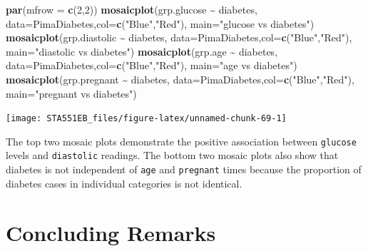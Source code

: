 \documentclass[
]{book}
\newenvironment{Shaded}{\begin{snugshade}}{\end{snugshade}}
\newcommand{\AttributeTok}[1]{\textcolor[rgb]{0.13,0.29,0.53}{#1}}
\newcommand{\DecValTok}[1]{\textcolor[rgb]{0.00,0.00,0.81}{#1}}
\newcommand{\FunctionTok}[1]{\textcolor[rgb]{0.13,0.29,0.53}{\textbf{#1}}}
\newcommand{\NormalTok}[1]{#1}
\newcommand{\SpecialCharTok}[1]{\textcolor[rgb]{0.81,0.36,0.00}{\textbf{#1}}}
\newcommand{\StringTok}[1]{\textcolor[rgb]{0.31,0.60,0.02}{#1}}
\begin{document}
\begin{Shaded}
\begin{Highlighting}[]
\FunctionTok{par}\NormalTok{(}\AttributeTok{mfrow =} \FunctionTok{c}\NormalTok{(}\DecValTok{2}\NormalTok{,}\DecValTok{2}\NormalTok{))}
\FunctionTok{mosaicplot}\NormalTok{(grp.glucose }\SpecialCharTok{\textasciitilde{}}\NormalTok{ diabetes, }\AttributeTok{data=}\NormalTok{PimaDiabetes,}\AttributeTok{col=}\FunctionTok{c}\NormalTok{(}\StringTok{"Blue"}\NormalTok{,}\StringTok{"Red"}\NormalTok{), }\AttributeTok{main=}\StringTok{"glucose vs diabetes"}\NormalTok{)}
\FunctionTok{mosaicplot}\NormalTok{(grp.diastolic }\SpecialCharTok{\textasciitilde{}}\NormalTok{ diabetes, }\AttributeTok{data=}\NormalTok{PimaDiabetes,}\AttributeTok{col=}\FunctionTok{c}\NormalTok{(}\StringTok{"Blue"}\NormalTok{,}\StringTok{"Red"}\NormalTok{), }\AttributeTok{main=}\StringTok{"diastolic vs diabetes"}\NormalTok{)}
\FunctionTok{mosaicplot}\NormalTok{(grp.age }\SpecialCharTok{\textasciitilde{}}\NormalTok{ diabetes, }\AttributeTok{data=}\NormalTok{PimaDiabetes,}\AttributeTok{col=}\FunctionTok{c}\NormalTok{(}\StringTok{"Blue"}\NormalTok{,}\StringTok{"Red"}\NormalTok{), }\AttributeTok{main=}\StringTok{"age vs diabetes"}\NormalTok{)}
\FunctionTok{mosaicplot}\NormalTok{(grp.pregnant }\SpecialCharTok{\textasciitilde{}}\NormalTok{ diabetes, }\AttributeTok{data=}\NormalTok{PimaDiabetes,}\AttributeTok{col=}\FunctionTok{c}\NormalTok{(}\StringTok{"Blue"}\NormalTok{,}\StringTok{"Red"}\NormalTok{), }\AttributeTok{main=}\StringTok{"pregnant vs diabetes"}\NormalTok{)}
\end{Highlighting}
\end{Shaded}

\begin{center}\texttt{[image: STA551EB\_files/figure-latex/unnamed-chunk-69-1]} \end{center}

The top two mosaic plots demonstrate the positive association between \texttt{glucose} levels and \texttt{diastolic} readings. The bottom two mosaic plots also show that diabetes is not independent of \texttt{age} and \texttt{pregnant} times because the proportion of diabetes cases in individual categories is not identical.

\hfill\break

\hypertarget{concluding-remarks}{%
\section{Concluding Remarks}\label{concluding-remarks}}
\end{document}
